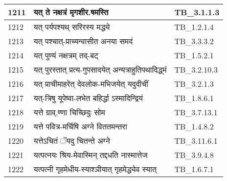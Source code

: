 \documentclass[17pt]{extarticle}
\begin{document}
\begin{longtable}{||p{0.4in}||p{4.9in}||p{0.9in}||}
    1211 & यत् ते नक्षत्रं मृगशीर.षमस्ति & TB\_3.1.1.3       \\
    
    \hline
        
    1212 & यत् पर्यपश्यथ् सरिरस्य मद्ध्ये & TB\_1.2.1.4       \\
    
    \hline
        
    1213 & यत् पश्चात्{-}प्राच्यन्वासीत अनया समदं & TB\_3.3.3.2       \\
    
    \hline
        
    1214 & यत् पुण्यं नक्षत्रम् तद्{-}बट् & TB\_1.5.2.1       \\
    
    \hline
        
    1215 & यत् पुरस्तात् प्रत्य{-}गुपसादयेत् अन्यत्राहुतिपथादिद्ध्मं & TB\_3.2.10.3       \\
    
    \hline
        
    1216 & यत् प्राचीमाहरेत् देवलोक{-}मभिजयेत् यदुदीचीं & TB\_3.2.1.3       \\
    
    \hline
        
    1217 & यत्{-}त्रिषु यूपेष्वा{-}लभेत बहिर्द्धा ऽस्मादिन्द्रियं & TB\_1.8.6.1       \\
    
    \hline
        
    1218 & यत्ते ग्राव्.ण्णा चिच्छिदुः सोम & TB\_3.7.13.1       \\
    
    \hline
        
    1219 & यत्ते पवित्र{-}मर्चिषि अग्ने विततमन्तरा & TB\_1.4.8.2       \\
    
    \hline
        
    1220 & यत्तेऽचितं ॅयदु चितन्ते अग्ने & TB\_3.11.6.1       \\
    
    \hline
        
    1221 & यत्पत्नयः श्रिय{-}मेवास्मिन् तद्दधति नास्मात्तेज & TB\_3.9.4.8       \\
    
    \hline
        
    1222 & यत्पत्नी गृहमेधीय{-}स्याश्ञीयात् गृहमेद्ध्येव स्यात् & TB\_1.6.7.1       \\
    
    \hline
        

\end{longtable}
\end{document}

